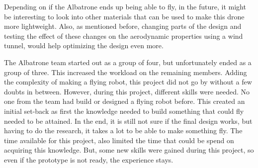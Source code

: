 Depending on if the Albatrone ends up being able to fly, in the future, it might be interesting to look into other materials that can be used to make this drone more lightweight. Also, as mentioned before, changing parts of the design and testing the effect of these changes on the aerodynamic properties using a wind tunnel, would help optimizing the design even more. 


The Albatrone team started out as a group of four, but unfortunately ended as a group of three. This increased the workload on the remaining members. Adding the complexity of making a flying robot, this project did not go by without a few doubts in between. However, during this project, different skills were needed. No one from the team had build or designed a flying robot before. This created an initial set-back as first the knowledge needed to build something that could fly needed to be attained. In the end, it is still not sure if the final design works, but having to do the research, it takes a lot to be able to make something fly. The time available for this project, also limited the time that could be spend on acquiring this knowledge. But, some new skills were gained during this project, so even if the prototype is not ready, the experience stays.